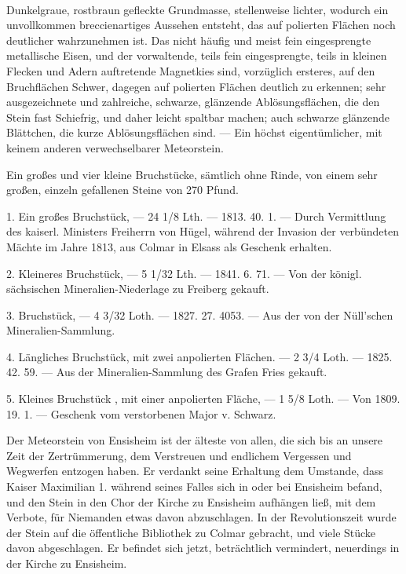 \documentclass[a4paper, 11pt, oneside, polutonikogreek, german]{article}
\begin{document}
\paragraph{}
Dunkelgraue, rostbraun gefleckte Grundmasse, stellenweise lichter, wodurch ein unvollkommen breccienartiges Aussehen entsteht, das auf polierten Flächen noch deutlicher wahrzunehmen ist. Das nicht häufig und meist fein eingesprengte metallische Eisen, und der vorwaltende, teils fein eingesprengte, teils in kleinen Flecken und Adern auftretende Magnetkies sind, vorzüglich ersteres, auf den Bruchflächen Schwer, dagegen auf polierten Flächen deutlich zu erkennen; sehr ausgezeichnete und zahlreiche, schwarze, glänzende Ablösungsflächen, die den Stein fast Schiefrig, und daher leicht spaltbar machen; auch schwarze glänzende Blättchen‚ die kurze Ablösungsflächen sind. — Ein höchst eigentümlicher, mit keinem anderen verwechselbarer Meteorstein.

Ein großes und vier kleine Bruchstücke, sämtlich ohne Rinde, von einem sehr großen, einzeln gefallenen Steine von 270 Pfund.

1. Ein großes Bruchstück, — 24 1/8 Lth. — 1813. 40. 1. — Durch Vermittlung des kaiserl. Ministers Freiherrn von Hügel, während der Invasion der verbündeten Mächte im Jahre 1813, aus Colmar in Elsass als Geschenk erhalten.

2. Kleineres Bruchstück, — 5 1/32 Lth. — 1841. 6. 71. — Von der königl. sächsischen Mineralien-Niederlage zu Freiberg gekauft.

3. Bruchstück, — 4 3/32 Loth. — 1827. 27. 4053.
— Aus der von der Nüll’schen Mineralien-Sammlung.

4. Längliches Bruchstück, mit zwei anpolierten Flächen. — 2 3/4 Loth. — 1825. 42. 59. — Aus der Mineralien-Sammlung des Grafen Fries gekauft.

5. Kleines Bruchstück , mit einer anpolierten Fläche, — 1 5/8 Loth. — Von 1809. 19. 1. — Geschenk vom verstorbenen Major v. Schwarz.

Der Meteorstein von Ensisheim ist der älteste von allen, die sich bis an unsere Zeit der Zertrümmerung, dem Verstreuen und endlichem Vergessen und Wegwerfen entzogen haben. Er verdankt seine Erhaltung dem Umstande, dass Kaiser Maximilian 1. während seines Falles sich in oder bei Ensisheim befand, und den Stein in den Chor der Kirche zu Ensisheim aufhängen ließ, mit dem Verbote, für Niemanden etwas davon abzuschlagen. In der Revolutionszeit wurde der Stein auf die öffentliche Bibliothek zu Colmar gebracht, und viele Stücke davon abgeschlagen. Er befindet sich jetzt, beträchtlich vermindert, neuerdings in der Kirche zu Ensisheim.
\end{document}
